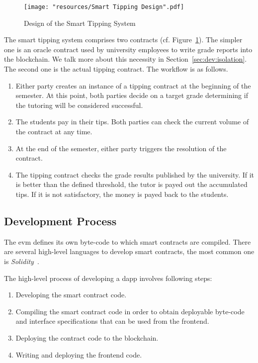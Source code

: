 \begin{figure}[]
	\centering
	\texttt{[image: "resources/Smart Tipping Design".pdf]}
	\caption{Design of the Smart Tipping System}
	\label{fig:smarttipper}
\end{figure}

The smart tipping system comprises two contracts (cf. Figure~\ref{fig:smarttipper}).
The simpler one is an oracle contract used by university employees to write
grade reports into the blockchain.
We talk more about this necessity in Section~\ref{sec:dev:isolation}.
The second one is the actual tipping contract.
The workflow is as follows.
\begin{enumerate}
	\item Either party creates an instance of a tipping contract at the beginning of the semester.
		At this point, both parties decide on a target grade
		determining if the tutoring will be considered successful.
	\item The students pay in their tips. Both parties can check the current volume of the contract at any time.
	\item At the end of the semester, either party triggers the resolution of the contract.
	\item The tipping contract checks the grade results published by the university.
		If it is better than the defined threshold, the tutor is payed out the accumulated tips.
		If it is not satisfactory, the money is payed back to the students.
\end{enumerate}

\subsection{Development Process}

The \ac{evm} defines its own byte-code to which smart contracts are compiled.
There are several high-level languages to develop smart contracts,
the most common one is \emph{Solidity}~\cite{Solidity}. 

The high-level process of developing a \ac{dapp} involves following steps:

\begin{enumerate}
    \item Developing the smart contract code.
    \item Compiling the smart contract code in order to obtain deployable byte-code and interface
        specifications that can be used from the frontend.
    \item Deploying the contract code to the blockchain.
    \item Writing and deploying the frontend code.
\end{enumerate}

